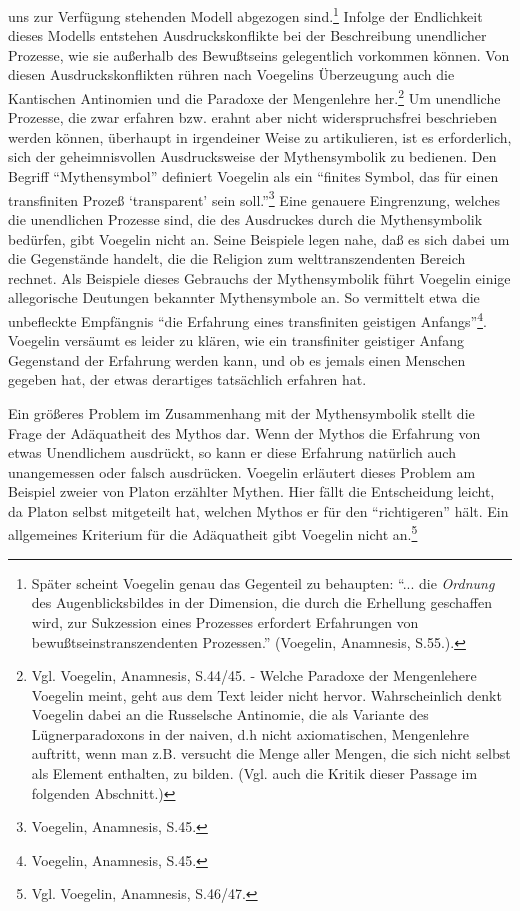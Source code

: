 uns zur Verfügung stehenden Modell abgezogen sind.\footnote{Später
  scheint Voegelin genau das Gegenteil zu behaupten: "`... die {\it
    Ordnung} des Augenblicksbildes in der Dimension, die durch die
  Erhellung geschaffen wird, zur Sukzession eines Prozesses erfordert
  Erfahrungen von bewußtseinstranszendenten Prozessen."' (Voegelin,
  Anamnesis, S.55.).} Infolge der Endlichkeit dieses Modells entstehen
Ausdruckskonflikte bei der Beschreibung unendlicher Prozesse, wie sie
außerhalb des Bewußtseins gelegentlich vorkommen können. Von diesen
Ausdruckskonflikten rühren nach Voegelins Überzeugung auch die
Kantischen Antinomien und die Paradoxe der Mengenlehre
her.\footnote{Vgl.  Voegelin, Anamnesis, S.44/45. - Welche Paradoxe der
  Mengenlehere Voegelin meint, geht aus dem Text leider nicht hervor.
  Wahrscheinlich denkt Voegelin dabei an die Russelsche Antinomie, die
  als Variante des Lügnerparadoxons in der naiven, d.h nicht
  axiomatischen, Mengenlehre auftritt, wenn man z.B. versucht die Menge
  aller Mengen, die sich nicht selbst als Element enthalten, zu bilden.
  (Vgl. auch die Kritik dieser Passage im folgenden Abschnitt.)}  Um
unendliche Prozesse, die zwar erfahren bzw. erahnt aber nicht
widerspruchsfrei beschrieben werden können, überhaupt in irgendeiner
Weise zu artikulieren, ist es erforderlich, sich der geheimnisvollen
Ausdrucksweise der Mythensymbolik zu bedienen. Den Begriff
"`Mythensymbol"' definiert Voegelin als ein "`finites Symbol, das für
einen transfiniten Prozeß `transparent' sein soll."'\footnote{Voegelin,
  Anamnesis, S.45.} Eine genauere Eingrenzung, welches die unendlichen
Prozesse sind, die des Ausdruckes durch die Mythensymbolik bedürfen,
gibt Voegelin nicht an.  Seine Beispiele legen nahe, daß es sich dabei
um die Gegenstände handelt, die die Religion zum welttranszendenten
Bereich rechnet. Als Beispiele dieses Gebrauchs der Mythensymbolik führt
Voegelin einige allegorische Deutungen bekannter Mythensymbole an. So
vermittelt etwa die unbefleckte Empfängnis "`die Erfahrung eines
transfiniten geistigen Anfangs"'\footnote{Voegelin, Anamnesis, S.45.}.
Voegelin versäumt es leider zu klären, wie ein transfiniter geistiger
Anfang Gegenstand der Erfahrung werden kann, und ob es jemals einen
Menschen gegeben hat, der etwas derartiges tatsächlich erfahren hat.

Ein größeres Problem im Zusammenhang mit der Mythensymbolik stellt die Frage
der Adäquatheit des Mythos dar. Wenn der Mythos die Erfahrung von etwas
Unendlichem ausdrückt, so kann er diese Erfahrung natürlich auch unangemessen
oder falsch ausdrücken. Voegelin erläutert dieses Problem am Beispiel zweier
von Platon erzählter Mythen. Hier fällt die Entscheidung leicht, da Platon
selbst mitgeteilt hat, welchen Mythos er für den "`richtigeren"' hält. Ein
allgemeines Kriterium für die Adäquatheit gibt Voegelin nicht
an.\footnote{Vgl. Voegelin, Anamnesis, S.46/47.}

